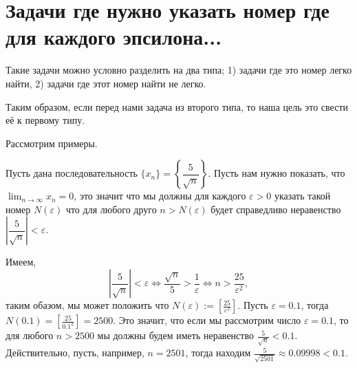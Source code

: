 
\section{Задачи где нужно указать номер где для каждого эпсилона...}

Такие задачи можно условно разделить на два типа; 1) задачи где это номер легко найти, 2) задачи где этот номер найти не легко.

Таким образом, если перед нами задача из второго типа, то наша цель это свести её к первому типу.

Рассмотрим примеры.

\begin{example}
 Пусть дана последовательность $\{x_n\} = \left\{\dfrac{5}{\sqrt{n}} \right\}$. Пусть нам нужно показать, что $\lim_{n\to \infty}x_n = 0$, это значит что мы должны для каждого $\varepsilon >0$ указать такой номер $N(\varepsilon)$ что для любого друго $n>N(\varepsilon)$ будет справедливо неравенство $\left| \dfrac{5}{\sqrt{n}} \right|<\varepsilon.$

 Имеем,
\[
\left| \dfrac{5}{\sqrt{n}} \right|<\varepsilon \Longleftrightarrow \dfrac{\sqrt{n}}{5} > \dfrac{1}{\varepsilon} \Longleftrightarrow n > \dfrac{25}{\varepsilon^2},
\]
таким обазом, мы может положить что $N(\varepsilon):= \left[ \frac{25}{\varepsilon^2} \right]$. Пусть $\varepsilon=0.1$, тогда $N(0.1) = \left[ \frac{25}{0.1^2} \right] = 2500$. Это значит, что если мы рассмотрим число $\varepsilon = 0.1$, то для любого $n>2500$ мы должны будем иметь неравенство $\frac{5}{\sqrt{n}}<0.1$. Действительно, пусть, например, $n = 2501$, тогда находим $\frac{5}{\sqrt{2501}} \approx 0.09998 <0.1$.
\end{example}



